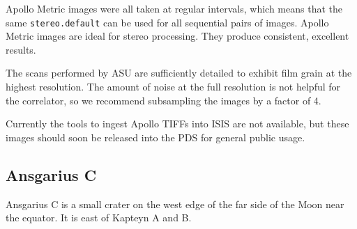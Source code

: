 Apollo Metric images were all taken at regular intervals, which means
that the same \texttt{stereo.default} can be used for all sequential
pairs of images. Apollo Metric images are ideal for stereo processing.
They produce consistent, excellent results.

The scans performed by ASU are sufficiently detailed to exhibit film
grain at the highest resolution.  The amount of noise at the full
resolution is not helpful for the correlator, so we recommend
subsampling the images by a factor of 4.

Currently the tools to ingest Apollo TIFFs into ISIS are not
available, but these images should soon be released into the PDS for
general public usage.

\subsection{Ansgarius C}


Ansgarius C is a small crater on the west edge of the far side of the
Moon near the equator. It is east of Kapteyn A and B.

